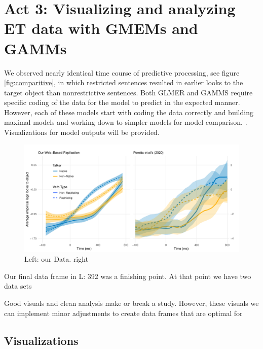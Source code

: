 \section{Act 3: Visualizing and analyzing ET data with GMEMs and GAMMs}

We observed nearly identical time course of predictive processing, see figure \ref{fig:comparitive}, in which restricted sentences resulted in earlier looks to the target object than nonrestrictive sentences. Both GLMER and GAMMS require specific coding of the data for the model to predict in the expected manner.  However, each of these models start with coding the data correctly and building maximal models and working down to simpler models for model comparison. \parencite{max model}. Visualizations for model outputs will be provided.

\begin{figure}[h]
    \centering
    \includegraphics[width=\textwidth]{figures/smooth_comparison_plot.pdf}
    \caption{Left: our Data. right \parencite{Porretta_et_al_2020}}
    \label{fig:smooth}
\end{figure}

Our final data frame in L: 392 was a finishing point. At that point we have two data sets

Good visuals and clean analysis make or break a study. However, these visuals we can implement minor adjustments to create data frames that are optimal for


\subsection{Visualizations}







